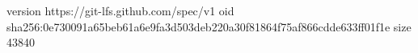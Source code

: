 version https://git-lfs.github.com/spec/v1
oid sha256:0e730091a65beb61a6e9fa3d503deb220a30f81864f75af866cdde633ff01f1e
size 43840
